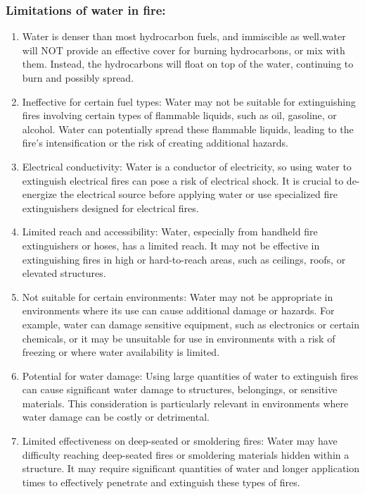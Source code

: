 \documentclass{article}
\begin{document}
\subsubsection*{Limitations of water in fire:}
\begin{enumerate}
  \item Water is denser than most hydrocarbon fuels, and immiscible as well.water will NOT provide an effective cover
  for burning hydrocarbons, or mix with them. Instead, the hydrocarbons will float on top of the water, continuing to burn and possibly spread.
  \item Ineffective for certain fuel types: Water may not be suitable for extinguishing fires involving certain types of flammable liquids, such as oil, gasoline, or alcohol. Water can potentially spread these flammable liquids, leading to the fire's intensification or the risk of creating additional hazards.

  \item Electrical conductivity: Water is a conductor of electricity, so using water to extinguish electrical fires can pose a risk of electrical shock. It is crucial to de-energize the electrical source before applying water or use specialized fire extinguishers designed for electrical fires.
  
  \item Limited reach and accessibility: Water, especially from handheld fire extinguishers or hoses, has a limited reach. It may not be effective in extinguishing fires in high or hard-to-reach areas, such as ceilings, roofs, or elevated structures.
  
  \item Not suitable for certain environments: Water may not be appropriate in environments where its use can cause additional damage or hazards. For example, water can damage sensitive equipment, such as electronics or certain chemicals, or it may be unsuitable for use in environments with a risk of freezing or where water availability is limited.
  
  \item Potential for water damage: Using large quantities of water to extinguish fires can cause significant water damage to structures, belongings, or sensitive materials. This consideration is particularly relevant in environments where water damage can be costly or detrimental.
  
  \item Limited effectiveness on deep-seated or smoldering fires: Water may have difficulty reaching deep-seated fires or smoldering materials hidden within a structure. It may require significant quantities of water and longer application times to effectively penetrate and extinguish these types of fires.
\end{enumerate}
\end{document}
